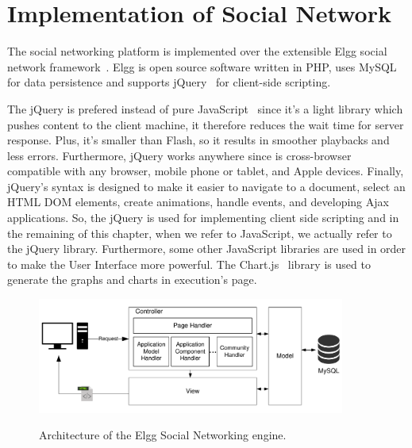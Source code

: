\section{Implementation of Social Network}
\label{sec:implementaion_of_social_netowrk}
The social networking platform is implemented over the extensible Elgg social network framework~\cite{elgg_url}.  Elgg is open source software written in PHP, uses MySQL for data persistence and supports jQuery~\cite{jquery_url} for client-side scripting.  

The jQuery is prefered instead of pure JavaScript~\cite{mccormick2004jquery} since it's a light library which pushes content to the client machine, it therefore reduces the wait time for server response. Plus, it's smaller than Flash, so it results in smoother playbacks and less errors. Furthermore, jQuery works anywhere since is cross-browser compatible with any browser, mobile phone or tablet, and Apple devices. Finally, jQuery's syntax is designed to make it easier to navigate to a document, select an HTML DOM elements, create animations, handle events, and developing Ajax applications. So, the jQuery is used for implementing client side scripting and in the remaining of this chapter, when we refer to JavaScript, we actually refer to the jQuery library. 
Furthermore, some other JavaScript libraries are used in order to make the User Interface more powerful. The Chart.js~\cite{chartjs_url} library is used to generate the graphs and charts in execution's page.

\begin{figure}[h]
	\caption{Architecture of the Elgg Social Networking engine.}
	\includegraphics[width=0.9\textwidth,natwidth=200,natheight=150]{./fig/elgg_architecture.pdf}
	\centering
	\label{fig:elgg_architecture}
\end{figure}

